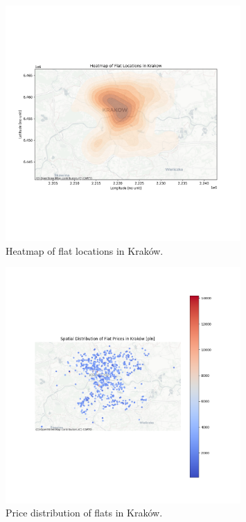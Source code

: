     \begin{figure}[H]
        \centering
        \includegraphics[width=0.8\textwidth]{figures/krakow_heatmap.png}
        \caption{Heatmap of flat locations in Kraków.}
        \label{fig:krakow_heatmap}
    \end{figure}

    \begin{figure}[H]
        \centering
        \includegraphics[width=0.8\textwidth]{figures/krakow_price_distribution.png}
        \caption{Price distribution of flats in Kraków.}
        \label{fig:krakow_price_distribution}
    \end{figure}


